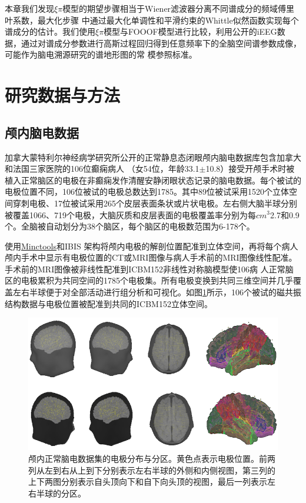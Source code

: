 本章我们发现$\xi\pi$模型的期望步骤相当于Wiener滤波器分离不同谱成分的频域傅里叶系数，最大化步骤
中通过最大化单调性和平滑约束的Whittle似然函数实现每个谱成分的估计。我们使用$\xi\pi$模型与FOOOF模型进行比较，利用公开的iEEG数据，通过对谱成分参数进行高斯过程回归得到任意频率下的全脑空间谱参数成像，可能作为脑电溯源研究的谱地形图的常
模参照标准。

\section{研究数据与方法}
\subsection{颅内脑电数据}
加拿大蒙特利尔神经病学研究所公开的正常静息态闭眼颅内脑电数据库包含加拿大和法国三家医院的106位癫痫病人
（女54位，年龄33.1$\pm$10.8）接受开颅手术时被植入正常脑区的电极在非癫痫发作清醒安静闭眼状态记录的脑电数据。每个被试的电极位置不同，106位被试的电极总数达到1785。其中89位被试采用1520个立体空间穿刺电极、17位被试采用265个皮层表面条状或片状电极。左右侧大脑半球分别被覆盖1066、719个电极，大脑灰质和皮层表面的电极覆盖率分别为每$cm^3$2.7和0.9个。全脑被自动划分为38个脑区，每个脑区的电极数范围为6-178个。

\cite{frauscher2018atlas}使用\href{www.bic.mni.mcgill.ca/ServicesSoftware/Services SoftwareMincToolKit}{Minctools}和IBIS
架构将颅内电极的解剖位置配准到立体空间，再将每个病人颅内手术中显示有电极位置的CT或MRI图像与病人手术前的MRI图像线性配准。手术前的MRI图像被非线性配准到ICBM152非线性对称脑模型使106病
人正常脑区的电极累积为共同空间的1785个电极集。所有电极变换到共同三维空间并几乎覆盖左右半球便于对全部活动进行组分析和可视化。如图\ref{electrodes}所示，106个被试的磁共振结构数据与电极位置被配准到共同的ICBM152立体空间。
\begin{figure}[!h]
\includegraphics[width=15cm]{pic/xipi/electrodes.png}
\caption{颅内正常脑电数据集的电极分布与分区。黄色点表示电极位置。前两列从左到右从上到下分别表示左右半球的外侧和内侧视图，第三列的上下两图分别表示自头顶向下和自下向头顶的视图，最后一列表示左右半球的分区。}
\label{electrodes}
\end{figure}

